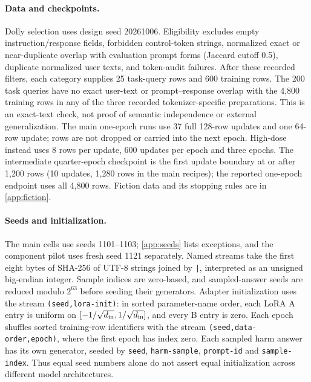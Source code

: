\documentclass{article}
\begin{document}
\paragraph{Data and checkpoints.} Dolly selection uses design seed 20261006.
Eligibility excludes empty instruction/response fields, forbidden control-token
strings, normalized exact or near-duplicate overlap with evaluation prompt forms
(Jaccard cutoff 0.5), duplicate normalized user texts, and token-audit failures.
After these recorded filters, each category supplies
25 task-query rows and 600 training rows. The 200 task queries have no exact
user-text or prompt--response overlap with the 4,800 training rows in any of
the three recorded tokenizer-specific preparations. This is an exact-text
check, not proof of semantic independence or external generalization.
The main one-epoch runs use 37 full 128-row updates and one 64-row update;
rows are not dropped or carried into the next epoch. High-dose instead uses
8 rows per update, 600 updates per epoch and three epochs. The intermediate
quarter-epoch checkpoint is the first update boundary at or after 1,200 rows
(10 updates, 1,280 rows in the main recipes); the reported one-epoch endpoint
uses all 4,800 rows. Fiction data and its stopping rules are in
\cref{app:fiction}.

\paragraph{Seeds and initialization.} The main cells use seeds 1101--1103;
\cref{app:seeds} lists exceptions, and the component pilot uses fresh seed
1121 separately. Named streams take the first eight bytes of SHA-256 of
UTF-8 strings joined by \texttt{|}, interpreted as an unsigned big-endian
integer. Sample indices are zero-based, and sampled-answer seeds are reduced
modulo $2^{63}$ before seeding their generators. Adapter initialization uses the stream \texttt{(seed,lora-init)}:
in sorted parameter-name order, each LoRA A entry is uniform on
$[-1/\sqrt{d_{\rm in}},1/\sqrt{d_{\rm in}}]$, and every B entry is zero.
Each epoch shuffles sorted training-row identifiers with the stream
\texttt{(seed,data-order,epoch)}, where the first epoch has index zero.
Each sampled harm answer has its own generator, seeded by
\texttt{seed}, \texttt{harm-sample}, \texttt{prompt-id} and
\texttt{sample-index}. Thus equal seed numbers
alone do not assert equal initialization across different model architectures.
\end{document}
